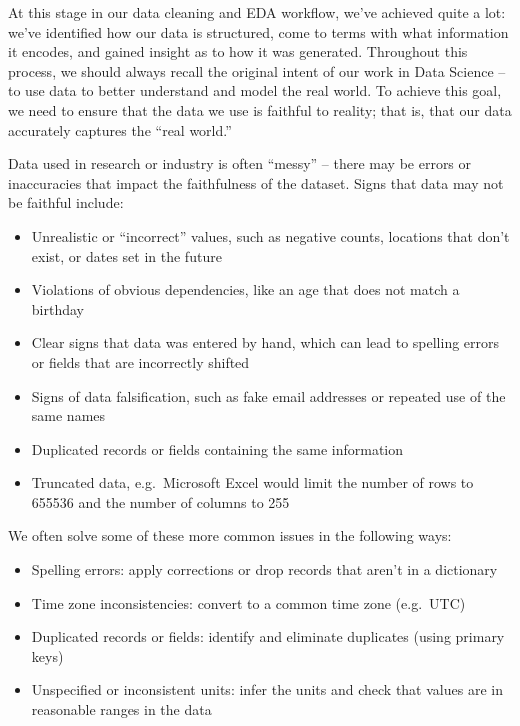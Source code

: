 \documentclass[
  letterpaper,
  DIV=11,
  numbers=noendperiod]{scrreprt}
\providecommand{\tightlist}{%
  \setlength{\itemsep}{0pt}\setlength{\parskip}{0pt}}\usepackage{longtable,booktabs,array}
\begin{document}
At this stage in our data cleaning and EDA workflow, we've achieved
quite a lot: we've identified how our data is structured, come to terms
with what information it encodes, and gained insight as to how it was
generated. Throughout this process, we should always recall the original
intent of our work in Data Science -- to use data to better understand
and model the real world. To achieve this goal, we need to ensure that
the data we use is faithful to reality; that is, that our data
accurately captures the ``real world.''

Data used in research or industry is often ``messy'' -- there may be
errors or inaccuracies that impact the faithfulness of the dataset.
Signs that data may not be faithful include:

\begin{itemize}
\tightlist
\item
  Unrealistic or ``incorrect'' values, such as negative counts,
  locations that don't exist, or dates set in the future
\item
  Violations of obvious dependencies, like an age that does not match a
  birthday
\item
  Clear signs that data was entered by hand, which can lead to spelling
  errors or fields that are incorrectly shifted
\item
  Signs of data falsification, such as fake email addresses or repeated
  use of the same names
\item
  Duplicated records or fields containing the same information
\item
  Truncated data, e.g.~Microsoft Excel would limit the number of rows to
  655536 and the number of columns to 255
\end{itemize}

We often solve some of these more common issues in the following ways:

\begin{itemize}
\tightlist
\item
  Spelling errors: apply corrections or drop records that aren't in a
  dictionary
\item
  Time zone inconsistencies: convert to a common time zone (e.g.~UTC)
\item
  Duplicated records or fields: identify and eliminate duplicates (using
  primary keys)
\item
  Unspecified or inconsistent units: infer the units and check that
  values are in reasonable ranges in the data
\end{itemize}
\end{document}

